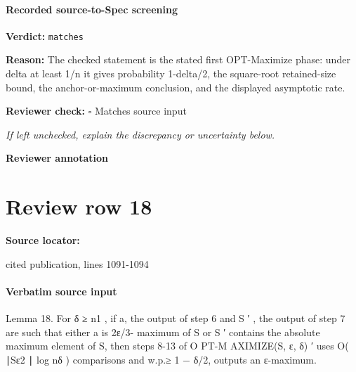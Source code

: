 \documentclass[10pt]{article}
\newcommand{\reviewerbox}{%
  \par\noindent\fbox{\parbox{0.96\linewidth}{\rule{0pt}{0.38in}}}\par
}
\newcommand{\reviewmatch}[1]{%
  \par\noindent\textbf{Reviewer check:} $\square$\; #1\par
  \noindent\emph{If left unchecked, explain the discrepancy or uncertainty below.}\par
}
\begin{document}
\paragraph{Recorded source-to-Spec screening}
\textbf{Verdict:} \texttt{matches}
\\
{\raggedright
\textbf{Reason:} The checked statement is the stated first OPT-\allowbreak{}Maximize phase:\allowbreak{} under delta at least 1/\allowbreak{}n it gives probability 1-\allowbreak{}delta/\allowbreak{}2, the square-\allowbreak{}root retained-\allowbreak{}size bound, the anchor-\allowbreak{}or-\allowbreak{}maximum conclusion, and the displayed asymptotic rate.\allowbreak{}
\par}
\reviewmatch{Matches source input}
\noindent\textbf{Reviewer annotation}\par
\reviewerbox
\clearpage
\hypertarget{source-claim-34b819d901bf2ac4}{}
\section*{Review row 18}
\textbf{Source locator:} {\footnotesize\raggedright cited publication, lines 1091-\allowbreak{}1094\par}
\paragraph{Verbatim source input}
\begin{ReviewVerbatim}
Lemma 18. For δ ≥ n1 , if a, the output of step 6 and S ′ , the output of step 7 are such that either a is 2ε/3-
maximum of S or S ′ contains the absolute maximum element of S, then steps 8-13 of O PT-M AXIMIZE(S, ε, δ)
           ′
uses O( ∣Sε2 ∣ log nδ ) comparisons and w.p.≥ 1 − δ/2, outputs an ε-maximum.
\end{ReviewVerbatim}
\end{document}
